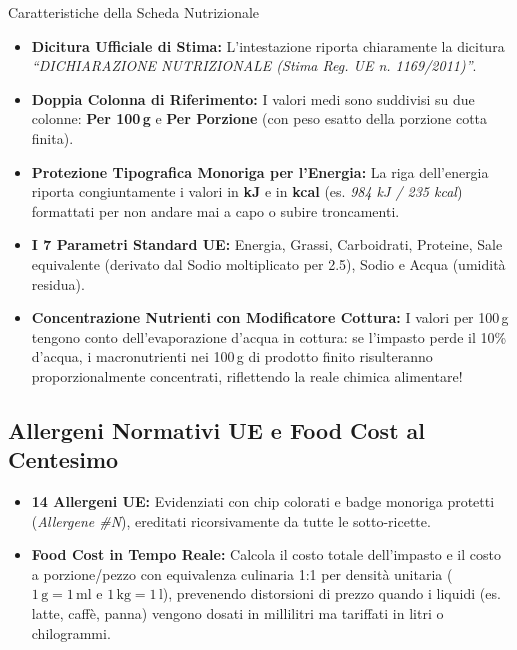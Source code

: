 \documentclass[11pt,a4paper]{article}
\begin{document}
\begin{simobox}{Caratteristiche della Scheda Nutrizionale}
\begin{itemize}[leftmargin=*,noitemsep]
    \item \textbf{Dicitura Ufficiale di Stima:} L'intestazione riporta chiaramente la dicitura \textit{``DICHIARAZIONE NUTRIZIONALE (Stima \textendash{} Reg. UE n. 1169/2011)''}.
    \item \textbf{Doppia Colonna di Riferimento:} I valori medi sono suddivisi su due colonne: \textbf{Per 100\,g} e \textbf{Per Porzione} (con peso esatto della porzione cotta finita).
    \item \textbf{Protezione Tipografica Monoriga per l'Energia:} La riga dell'energia riporta congiuntamente i valori in \textbf{kJ} e in \textbf{kcal} (es. \textit{984 kJ / 235 kcal}) formattati per non andare mai a capo o subire troncamenti.
    \item \textbf{I 7 Parametri Standard UE:} Energia, Grassi, Carboidrati, Proteine, Sale equivalente (derivato dal Sodio moltiplicato per 2.5), Sodio e Acqua (umidit\`a residua).
    \item \textbf{Concentrazione Nutrienti con Modificatore Cottura:} I valori per 100\,g tengono conto dell'evaporazione d'acqua in cottura: se l'impasto perde il 10\% d'acqua, i macronutrienti nei 100\,g di prodotto finito risulteranno proporzionalmente concentrati, riflettendo la reale chimica alimentare!
\end{itemize}
\end{simobox}

\subsection{Allergeni Normativi UE e Food Cost al Centesimo}
\begin{itemize}[leftmargin=*]
    \item \textbf{14 Allergeni UE:} Evidenziati con chip colorati e badge monoriga protetti (\textit{Allergene \#N}), ereditati ricorsivamente da tutte le sotto-ricette.
    \item \textbf{Food Cost in Tempo Reale:} Calcola il costo totale dell'impasto e il costo a porzione/pezzo con equivalenza culinaria 1:1 per densit\`a unitaria ($1\,\text{g} = 1\,\text{ml}$ e $1\,\text{kg} = 1\,\text{l}$), prevenendo distorsioni di prezzo quando i liquidi (es. latte, caff\`e, panna) vengono dosati in millilitri ma tariffati in litri o chilogrammi.
\end{itemize}
\end{document}
